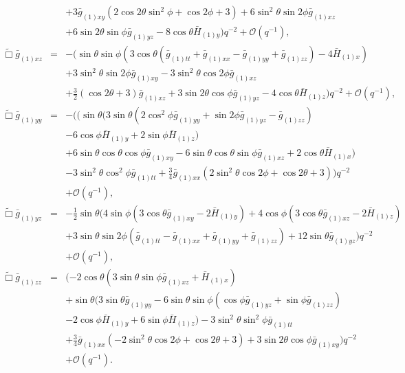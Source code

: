 \documentclass[a4paper,11pt]{article}
\numberwithin{equation}{section}
\begin{document}
\begin{eqnarray}
&&+3 \bar{g}_{(1)xy} (2 \cos 2\theta  \sin ^2\phi +\cos 2 \phi +3)+6 \sin ^2\theta  \sin 2 \phi 
   \bar{g}_{(1)xz} \nonumber \\
   &&+6 \sin 2 \theta  \sin \phi  \bar{g}_{(1)yz}-8 \cos
   \theta  \bar{H}_{(1) y})    q^{-2} +\mathcal{O}(q^{-1}),\\
%
\label{eqn:efexz}
\tilde{\Box}\bar{g}_{(1)xz}&=&- (\sin \theta  \sin \phi  (3 \cos \theta  (\bar{g}_{(1)tt}+\bar{g}_{(1)xx}-\bar{g}_{(1)yy}+\bar{g}_{(1)zz})-4
   \bar{H}_{(1) x}) \nonumber \\
   &&+3 \sin ^2\theta \sin 2 \phi  \bar{g}_{(1)xy}-3 \sin
   ^2\theta  \cos 2 \phi  \bar{g}_{(1)xz} \nonumber \\
   &&+\frac{3}{2} (\cos 2 \theta +3)
   \bar{g}_{(1)xz}+3 \sin 2 \theta  \cos \phi  \bar{g}_{(1)yz}-4 \cos
   \theta  \bar{H}_{(1)z})    q^{-2} +\mathcal{O}(q^{-1}),\\
%
\label{eqn:efeyy}
\tilde{\Box}\bar{g}_{(1)yy}&=&-( (\sin \theta (3 \sin \theta  (2 \cos ^2\phi  \bar{g}_{(1)yy}+\sin 2 \phi  \bar{g}_{(1)yz}-\bar{g}_{(1)zz}) \nonumber \\
&&-6 \cos\phi \bar{H}_{(1) y}+2 \sin \phi  \bar{H}_{(1) z}) \nonumber \\
&&+6 \sin \theta \cos
   \theta \cos \phi  \bar{g}_{(1)xy}-6 \sin \theta  \cos \theta  \sin   \phi  \bar{g}_{(1)xz}+2 \cos \theta  \bar{H}_{(1) x}) \nonumber \\
   &&-3 \sin ^2\theta \cos ^2\phi  \bar{g}_{(1)tt}+\frac{3}{4} \bar{g}_{(1)xx} (2 \sin ^2\theta  \cos 2 \phi +\cos 2 \theta +3)  )  q^{-2} \nonumber \\
&&+\mathcal{O}(q^{-1}),\\
%
\label{eqn:efeyz}
\tilde{\Box}\bar{g}_{(1)yz}&=&-\frac{1}{2} \sin \theta (4 \sin \phi  (3 \cos \theta  \bar{g}_{(1)xy}-2 \bar{H}_{(1) y})+4 \cos \phi  (3 \cos \theta  \bar{g}_{(1)xz}-2 \bar{H}_{(1) z}) \nonumber \\
&&+3 \sin \theta  \sin 2 \phi  (\bar{g}_{(1)tt}-\bar{g}_{(1)xx}+\bar{g}_{(1)yy}+\bar{g}_{(1)zz})+12 \sin \theta  \bar{g}_{(1)yz})  q^{-2} \nonumber \\
&&+\mathcal{O}(q^{-1}),\\
%
\label{eqn:efezz}
\tilde{\Box}\bar{g}_{(1)zz}&=&(-2 \cos \theta  (3 \sin \theta  \sin \phi  \bar{g}_{(1)xz}+\bar{H}_{(1)x}) \nonumber \\
&&+ \sin \theta  (3 \sin \theta  \bar{g}_{(1)yy}-6 \sin\theta  \sin \phi  (\cos \phi  \bar{g}_{(1)yz}+\sin \phi 
   \bar{g}_{(1)zz}) \nonumber \\
   &&-2 \cos \phi  \bar{H}_{(1) y} +6 \sin \phi  \bar{H}_{(1)z}) -3  \sin ^2\theta  \sin ^2\phi  \bar{g}_{(1)tt} \nonumber \\
   &&+\frac{3}{4}  \bar{g}_{(1)xx} (-2 \sin ^2\theta  \cos 2 \phi +\cos 2 \theta
   +3) +3 \sin 2 \theta  \cos \phi  \bar{g}_{(1)xy})  q^{-2} \nonumber \\
&&+\mathcal{O}(q^{-1}).
\end{eqnarray}
\end{document}
